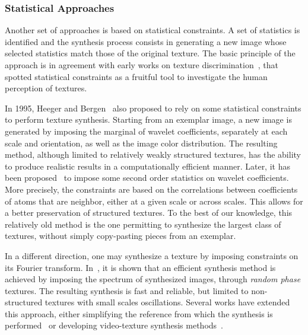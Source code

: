 \subsubsection{Statistical Approaches}

Another set of approaches is based on statistical constraints.
A set of statistics is identified and the synthesis process consists in generating a new image whose selected statistics match those of the original texture.
The basic principle of the approach is in agreement with early works on texture discrimination~\cite{Julesz1981}, that spotted statistical constraints as a fruitful tool to investigate the human perception of textures.

In 1995, Heeger and Bergen~\cite{Heeger1995} also proposed to rely on some statistical constraints to perform texture synthesis.
Starting from an exemplar image, a new image is generated by imposing the marginal of wavelet coefficients, separately at each scale and orientation, as well as the image color distribution.
The resulting method, although limited to relatively weakly structured textures, has the ability to produce realistic results in a computationally efficient manner.
Later, it has been proposed~\cite{portilla2000parametric} to impose some second order statistics on wavelet coefficients.
More precisely, the constraints are based on the correlations between coefficients of atoms that are neighbor, either at a given scale or across scales.
This allows for a better preservation of structured textures.
To the best of our knowledge, this relatively old method is the one permitting to synthesize the largest class of textures, without simply copy-pasting pieces from an exemplar.

In a different direction, one may synthesize a texture by imposing constraints on its Fourier transform.
In~\cite{galerne2011random}, it is shown that an efficient synthesis method is achieved by imposing the spectrum of synthesized images, through {\it random phase} textures.
The resulting synthesis is fast and reliable, but limited to non-structured textures with small scales oscillations.
Several works have extended this approach, either simplifying the reference from which the synthesis is performed~\cite{desolneux2012compact,galerne2012gabor} or developing video-texture synthesis methods~\cite{xia2012compact}.

